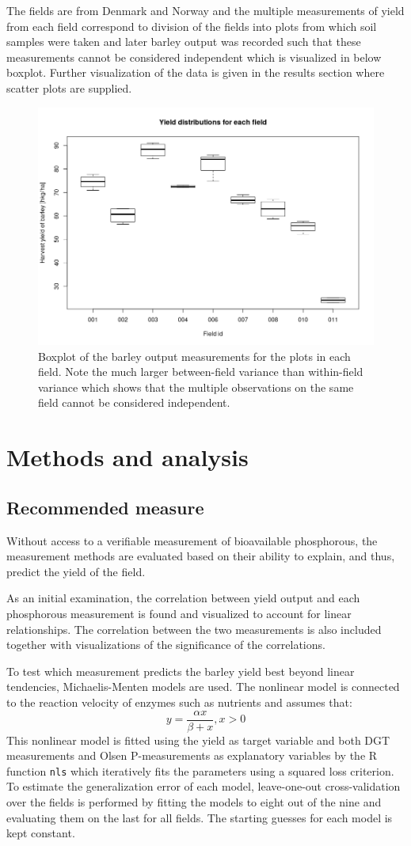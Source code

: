 \documentclass[12pt,fleqn]{article}
\begin{document}
The fields are from Denmark and Norway and the multiple measurements of yield from each field correspond to division of the fields into plots from which soil samples were taken and later barley output was recorded such that these measurements cannot be considered independent which is visualized in below boxplot. Further visualization of the data is given in the results section where scatter plots are supplied.
\begin{figure}[H]
	\centering
	\includegraphics[width=.7\linewidth]{p2_fieldbox}
	\caption{Boxplot of the barley output measurements for the plots in each field. Note the much larger between-field variance than within-field variance which shows that the multiple observations on the same field cannot be considered independent.}
\end{figure}
\section{Methods and analysis}
\subsection{Recommended measure}
Without access to a verifiable measurement of bioavailable phosphorous, the measurement methods are evaluated based on their ability to explain, and thus, predict the yield of the field. 

As an initial examination, the correlation between yield output and each phosphorous measurement is found and visualized to account for linear relationships. The correlation between the two measurements is also included together with visualizations of the significance of the correlations.

To test which measurement predicts the barley yield best beyond linear tendencies, Michaelis-Menten models are used. The nonlinear model is connected to the reaction velocity of enzymes such as nutrients \cite{michment} and assumes that:
\[
y = \frac{\alpha x}{\beta + x}, x >0
\]
This nonlinear model is fitted using the yield as target variable and both DGT measurements and Olsen P-measurements as explanatory variables by the R function \texttt{nls} which iteratively fits the parameters using a squared loss criterion.  To estimate the generalization error of each model, leave-one-out cross-validation over the fields is performed by fitting the models to eight out of the nine and evaluating them on the last for all fields. The starting guesses for each model is kept constant.
\end{document}
